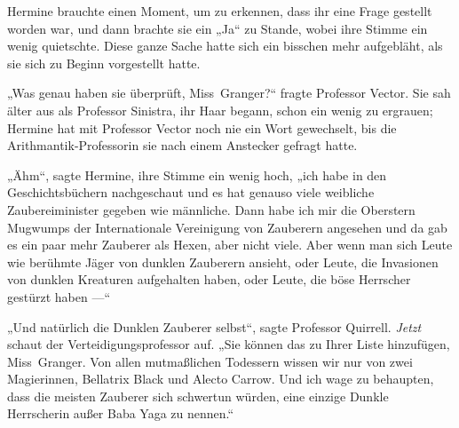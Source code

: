 Hermine brauchte einen Moment, um zu erkennen, dass ihr eine Frage gestellt worden war, und dann brachte sie ein
„Ja“ zu Stande, wobei ihre Stimme ein wenig quietschte. Diese ganze Sache hatte sich ein bisschen mehr aufgebläht, als sie sich zu Beginn vorgestellt hatte.

„Was genau haben sie überprüft, Miss~Granger?“ fragte Professor Vector. Sie sah älter aus als Professor Sinistra, ihr Haar begann, schon ein wenig zu ergrauen; Hermine hat mit Professor Vector noch nie ein Wort gewechselt, bis die Arithmantik-Professorin sie nach einem Anstecker gefragt hatte.

„Ähm“, sagte Hermine, ihre Stimme ein wenig hoch, „ich habe in den Geschichtsbüchern nachgeschaut und es hat genauso viele weibliche Zaubereiminister gegeben wie männliche. Dann habe ich mir die Oberstern Mugwumps der Internationale Vereinigung von Zauberern angesehen und da gab es ein paar mehr Zauberer als Hexen, aber nicht viele. Aber wenn man sich Leute wie berühmte Jäger von dunklen Zauberern ansieht, oder Leute, die Invasionen von dunklen Kreaturen aufgehalten haben, oder Leute, die böse Herrscher gestürzt haben —“

„Und natürlich die Dunklen Zauberer selbst“, sagte Professor Quirrell. \emph{Jetzt} schaut der Verteidigungsprofessor auf.
„Sie können das zu Ihrer Liste hinzufügen, Miss~Granger. Von allen mutmaßlichen Todessern wissen wir nur von zwei Magierinnen, Bellatrix Black und Alecto Carrow. Und ich wage zu behaupten, dass die meisten Zauberer sich schwertun würden, eine einzige Dunkle Herrscherin außer Baba Yaga zu nennen.“

